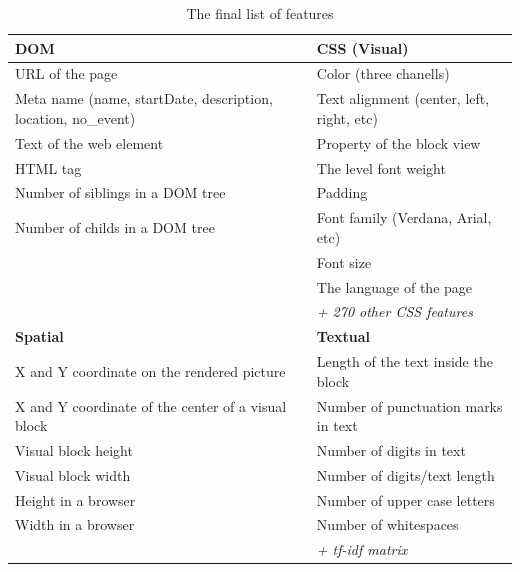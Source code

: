 \begin{table}[h]
\begin{center}
{\renewcommand{\arraystretch}{1.2}
\begin{tabular}{| p{6cm} | p{6cm} |}
\hline
\textbf{DOM}   &   \textbf{CSS (Visual)}\\
\hline
URL of the page    &    Color (three chanells)\\
Meta name (name, startDate, description, location, no\_event)    &    Text alignment (center, left, right, etc)    \\
Text of the web element    &    Property of the block view    \\
HTML tag    &    The level font weight    \\
Number of siblings in a DOM tree    &    Padding    \\
Number of childs in a DOM tree    &    Font family (Verdana, Arial, etc)    \\
    &    Font size \\
    &    The language of the page \\
    
    &    \textit{+ 270 other CSS features} \\
\hline
\textbf{Spatial}   &   \textbf{Textual}  \\
\hline
X and Y coordinate on the rendered picture    &    Length of the text inside the block    \\
X and Y coordinate of the center of a visual block    &    Number of punctuation marks in text    \\
Visual block height     &    Number of digits in text    \\
Visual block width        &    Number of digits/text length    \\
Height in a browser     &    Number of upper case letters    \\
Width in a browser     &    Number of whitespaces    \\

     &    \textit{+ tf-idf matrix}    \\
\hline
\end{tabular}}
\caption{The final list of features}
\label{table:featurelist}
\end{center}
\end{table}    

